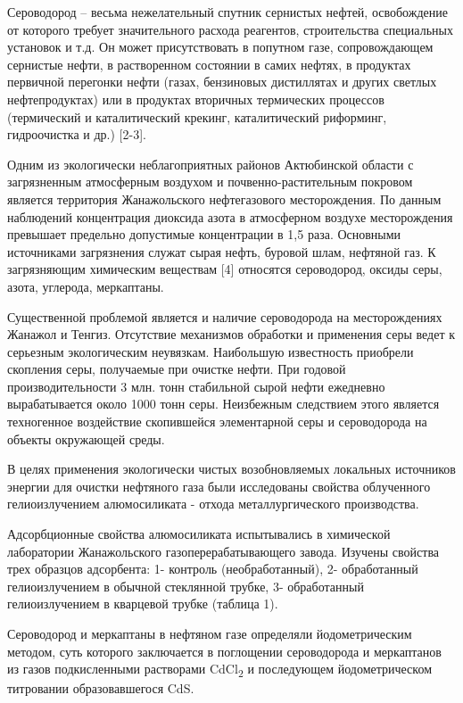 Сероводород -- весьма нежелательный спутник сернистых нефтей,
освобождение от которого требует значительного расхода реагентов,
строительства специальных установок и т.д. Он может присутствовать в
попутном газе, сопровождающем сернистые нефти, в растворенном состоянии
в самих нефтях, в продуктах первичной перегонки нефти (газах, бензиновых
дистиллятах и других светлых нефтепродуктах) или в продуктах вторичных
термических процессов (термический и каталитический крекинг,
каталитический риформинг, гидроочистка и др.) {[}2-3{]}.

Одним из экологически неблагоприятных районов Актюбинской области с
загрязненным атмосферным воздухом и почвенно-растительным покровом
является территория Жанажольского нефтегазового месторождения. По данным
наблюдений концентрация диоксида азота в атмосферном воздухе
месторождения превышает предельно допустимые концентрации в 1,5 раза.
Основными источниками загрязнения служат сырая нефть, буровой шлам,
нефтяной газ. К загрязняющим химическим веществам {[}4{]} относятся
сероводород, оксиды серы, азота, углерода, меркаптаны.

Существенной проблемой является и наличие сероводорода на месторождениях
Жанажол и Тенгиз. Отсутствие механизмов обработки и применения серы
ведет к серьезным экологическим неувязкам. Наибольшую известность
приобрели скопления серы, получаемые при очистке нефти. При годовой
производительности 3 млн. тонн стабильной сырой нефти ежедневно
вырабатывается около 1000 тонн серы. Неизбежным следствием этого
является техногенное воздействие скопившейся элементарной серы и
сероводорода на объекты окружающей среды.

В целях применения экологически чистых возобновляемых локальных
источников энергии для очистки нефтяного газа были исследованы свойства
облученного гелиоизлучением алюмосиликата - отхода металлургического
производства.

Адсорбционные свойства алюмосиликата испытывались в химической
лаборатории Жанажольского газоперерабатывающего завода. Изучены свойства
трех образцов адсорбента: 1- контроль (необработанный), 2- обработанный
гелиоизлучением в обычной стеклянной трубке, 3- обработанный
гелиоизлучением в кварцевой трубке (таблица 1).

Сероводород и меркаптаны в нефтяном газе определяли йодометрическим
методом, суть которого заключается в поглощении сероводорода и
меркаптанов из газов подкисленными растворами CdCl\textsubscript{2} и
последующем йодометрическом титровании образовавшегося CdS.

